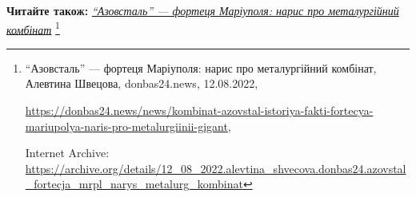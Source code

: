  
 
 
 
 


\textbf{Читайте також:} \href{https://archive.org/details/12_08_2022.alevtina_shvecova.donbas24.azovstal_fortecja_mrpl_narys_metalurg_kombinat}{\emph{\enquote{Азовсталь} — фортеця Маріуполя: нарис про металургійний комбінат}}%
\footnote{\enquote{Азовсталь} — фортеця Маріуполя: нарис про металургійний комбінат, Алевтина Швецова, donbas24.news, 12.08.2022, \par%
\url{https://donbas24.news/news/kombinat-azovstal-istoriya-fakti-fortecya-mariupolya-naris-pro-metalurgiinii-gigant}, \par%
Internet Archive: \url{https://archive.org/details/12_08_2022.alevtina_shvecova.donbas24.azovstal_fortecja_mrpl_narys_metalurg_kombinat}%
}
